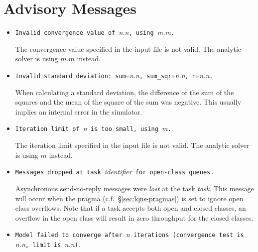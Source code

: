 \section{Advisory Messages}
\label{sec:advisory-messages}

\begin{itemize}
\item \texttt{Invalid convergence value of }\emph{n.n}\texttt{, using
  }\emph{m.m}\texttt{.}
  
  The convergence value specified in the
  input file is not valid.  The analytic solver is using $m.m$
  instead.

\item \texttt{Invalid standard deviation: sum=}\emph{n.n}\texttt{,
    sum\_sqr=}\emph{n.n}\texttt{, n=}\emph{n.n}\texttt{.}
  
  When calculating a standard
  deviation, the difference of the sum
  of the squares and the mean of the square of the sum was negative.
  This usually implies an internal error in the simulator.

\item \texttt{Iteration limit of }\emph{n}\texttt{ is too small, using
  }\emph{m}\texttt{.}
  
  The iteration limit specified in the
  input file is not valid.  The analytic solver is using $m$ instead.

\item \texttt{Messages dropped at task }\emph{identifier}\texttt{ for
    open-class queues.}
  
  Asynchronous send-no-reply messages were
  \emph{lost} at the task \emph{task}.  This message will occur when
  the  pragma
  (c.f.~\S\ref{sec:lqns-pragmas}) is set to ignore open class
  overflows.  Note that if a task accepts both open and closed
  classes, an overflow in the
  open class will result in zero throughput for
  the closed classes.

\item \texttt{Model failed to converge after }\emph{n}\texttt{
    iterations (convergence test is }\emph{n.n}\texttt{, limit is
  }\emph{n.n}\texttt{).}
  

\end{itemize}
